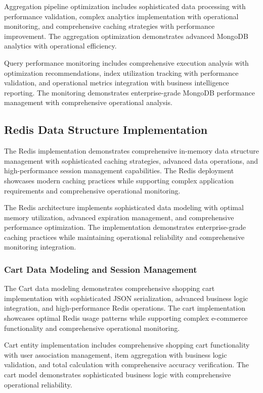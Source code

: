 Aggregation pipeline optimization includes sophisticated data processing with performance validation, complex analytics implementation with operational monitoring, and comprehensive caching strategies with performance improvement. The aggregation optimization demonstrates advanced MongoDB analytics with operational efficiency.

Query performance monitoring includes comprehensive execution analysis with optimization recommendations, index utilization tracking with performance validation, and operational metrics integration with business intelligence reporting. The monitoring demonstrates enterprise-grade MongoDB performance management with comprehensive operational analysis.

\subsection{Redis Data Structure Implementation}

The Redis implementation demonstrates comprehensive in-memory data structure management with sophisticated caching strategies, advanced data operations, and high-performance session management capabilities. The Redis deployment showcases modern caching practices while supporting complex application requirements and comprehensive operational monitoring.

The Redis architecture implements sophisticated data modeling with optimal memory utilization, advanced expiration management, and comprehensive performance optimization. The implementation demonstrates enterprise-grade caching practices while maintaining operational reliability and comprehensive monitoring integration.

\subsubsection{Cart Data Modeling and Session Management}

The Cart data modeling demonstrates comprehensive shopping cart implementation with sophisticated JSON serialization, advanced business logic integration, and high-performance Redis operations. The cart implementation showcases optimal Redis usage patterns while supporting complex e-commerce functionality and comprehensive operational monitoring.

Cart entity implementation includes comprehensive shopping cart functionality with user association management, item aggregation with business logic validation, and total calculation with comprehensive accuracy verification. The cart model demonstrates sophisticated business logic with comprehensive operational reliability.

